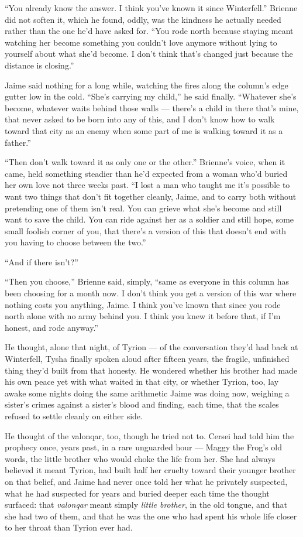 “You already know the answer. I think you’ve known it since Winterfell.” Brienne did not soften it, which he found, oddly, was the kindness he actually needed rather than the one he’d have asked for. “You rode north because staying meant watching her become something you couldn’t love anymore without lying to yourself about what she’d become. I don’t think that’s changed just because the distance is closing.”

Jaime said nothing for a long while, watching the fires along the column’s edge gutter low in the cold. “She’s carrying my child,” he said finally. “Whatever she’s become, whatever waits behind those walls — there’s a child in there that’s mine, that never asked to be born into any of this, and I don’t know how to walk toward that city as an enemy when some part of me is walking toward it as a father.”

“Then don’t walk toward it as only one or the other.” Brienne’s voice, when it came, held something steadier than he’d expected from a woman who’d buried her own love not three weeks past. “I lost a man who taught me it’s possible to want two things that don’t fit together cleanly, Jaime, and to carry both without pretending one of them isn’t real. You can grieve what she’s become and still want to save the child. You can ride against her as a soldier and still hope, some small foolish corner of you, that there’s a version of this that doesn’t end with you having to choose between the two.”

“And if there isn’t?”

“Then you choose,” Brienne said, simply, “same as everyone in this column has been choosing for a month now. I don’t think you get a version of this war where nothing costs you anything, Jaime. I think you’ve known that since you rode north alone with no army behind you. I think you knew it before that, if I’m honest, and rode anyway.”

\sceneBreak

He thought, alone that night, of Tyrion — of the conversation they’d had back at Winterfell, Tysha finally spoken aloud after fifteen years, the fragile, unfinished thing they’d built from that honesty. He wondered whether his brother had made his own peace yet with what waited in that city, or whether Tyrion, too, lay awake some nights doing the same arithmetic Jaime was doing now, weighing a sister’s crimes against a sister’s blood and finding, each time, that the scales refused to settle cleanly on either side.

He thought of the valonqar, too, though he tried not to. Cersei had told him the prophecy once, years past, in a rare unguarded hour — Maggy the Frog’s old words, the little brother who would choke the life from her. She had always believed it meant Tyrion, had built half her cruelty toward their younger brother on that belief, and Jaime had never once told her what he privately suspected, what he had suspected for years and buried deeper each time the thought surfaced: that \textit{valonqar} meant simply \textit{little brother}, in the old tongue, and that she had two of them, and that he was the one who had spent his whole life closer to her throat than Tyrion ever had.


